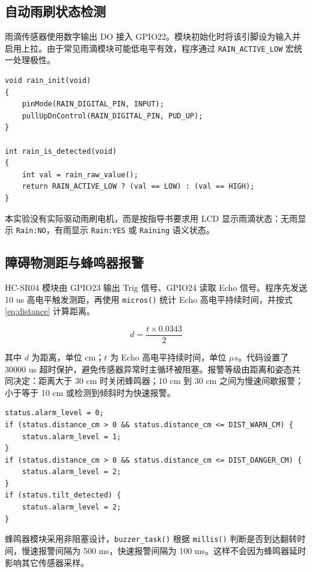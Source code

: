 \documentclass[UTF8,a4paper,12pt]{ctexart}
\begin{document}
\subsection{自动雨刷状态检测}

雨滴传感器使用数字输出 DO 接入 GPIO22。模块初始化时将该引脚设为输入并启用上拉。由于常见雨滴模块可能低电平有效，程序通过 \texttt{RAIN\_ACTIVE\_LOW} 宏统一处理极性。

\begin{lstlisting}[caption={雨滴检测逻辑摘录}]
void rain_init(void)
{
    pinMode(RAIN_DIGITAL_PIN, INPUT);
    pullUpDnControl(RAIN_DIGITAL_PIN, PUD_UP);
}

int rain_is_detected(void)
{
    int val = rain_raw_value();
    return RAIN_ACTIVE_LOW ? (val == LOW) : (val == HIGH);
}
\end{lstlisting}

本实验没有实际驱动雨刷电机，而是按指导书要求用 LCD 显示雨滴状态：无雨显示 \texttt{Rain:NO}，有雨显示 \texttt{Rain:YES} 或 \texttt{Raining} 语义状态。

\subsection{障碍物测距与蜂鸣器报警}

HC-SR04 模块由 GPIO23 输出 Trig 信号、GPIO24 读取 Echo 信号。程序先发送 10 us 高电平触发测距，再使用 \texttt{micros()} 统计 Echo 高电平持续时间，并按式 \ref{eq:distance} 计算距离。

\begin{equation}
d=\frac{t \times 0.0343}{2}
\label{eq:distance}
\end{equation}

其中 $d$ 为距离，单位 cm；$t$ 为 Echo 高电平持续时间，单位 $\mu s$。代码设置了 30000 us 超时保护，避免传感器异常时主循环被阻塞。报警等级由距离和姿态共同决定：距离大于 30 cm 时关闭蜂鸣器；10 cm 到 30 cm 之间为慢速间歇报警；小于等于 10 cm 或检测到倾斜时为快速报警。

\begin{lstlisting}[caption={主循环报警等级计算摘录}]
status.alarm_level = 0;
if (status.distance_cm > 0 && status.distance_cm <= DIST_WARN_CM) {
    status.alarm_level = 1;
}
if (status.distance_cm > 0 && status.distance_cm <= DIST_DANGER_CM) {
    status.alarm_level = 2;
}
if (status.tilt_detected) {
    status.alarm_level = 2;
}
\end{lstlisting}

蜂鸣器模块采用非阻塞设计，\texttt{buzzer\_task()} 根据 \texttt{millis()} 判断是否到达翻转时间，慢速报警间隔为 500 ms，快速报警间隔为 100 ms。这样不会因为蜂鸣器延时影响其它传感器采样。
\end{document}

